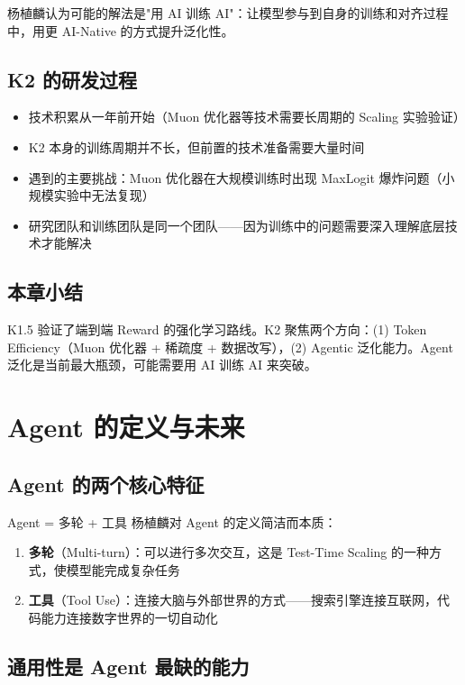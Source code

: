 \documentclass[a4paper]{article}
\begin{document}
杨植麟认为可能的解法是"用 AI 训练 AI"：让模型参与到自身的训练和对齐过程中，用更 AI-Native 的方式提升泛化性。

\subsection{K2 的研发过程}

\begin{itemize}
    \item 技术积累从一年前开始（Muon 优化器等技术需要长周期的 Scaling 实验验证）
    \item K2 本身的训练周期并不长，但前置的技术准备需要大量时间
    \item 遇到的主要挑战：Muon 优化器在大规模训练时出现 MaxLogit 爆炸问题（小规模实验中无法复现）
    \item 研究团队和训练团队是同一个团队——因为训练中的问题需要深入理解底层技术才能解决
\end{itemize}

\subsection{本章小结}

K1.5 验证了端到端 Reward 的强化学习路线。K2 聚焦两个方向：(1) Token Efficiency（Muon 优化器 + 稀疏度 + 数据改写），(2) Agentic 泛化能力。Agent 泛化是当前最大瓶颈，可能需要用 AI 训练 AI 来突破。


\section{Agent 的定义与未来}

\subsection{Agent 的两个核心特征}

\begin{importantbox}{Agent = 多轮 + 工具}
杨植麟对 Agent 的定义简洁而本质：
\begin{enumerate}
    \item \textbf{多轮}（Multi-turn）：可以进行多次交互，这是 Test-Time Scaling 的一种方式，使模型能完成复杂任务
    \item \textbf{工具}（Tool Use）：连接大脑与外部世界的方式——搜索引擎连接互联网，代码能力连接数字世界的一切自动化
\end{enumerate}
\end{importantbox}

\subsection{通用性是 Agent 最缺的能力}
\end{document}
